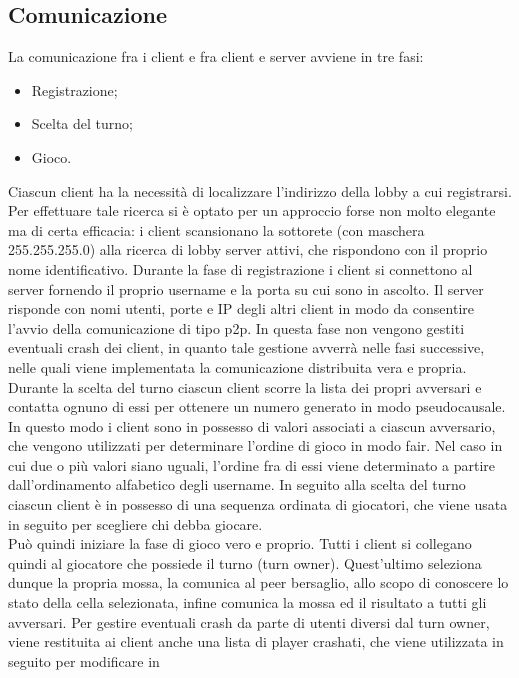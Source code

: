 \subsection{Comunicazione}
La comunicazione fra i client e fra client e server avviene in tre fasi:
\begin{itemize}
 \item Registrazione;
 \item Scelta del turno;
\item Gioco.
\end{itemize}
Ciascun client ha la necessità di localizzare l'indirizzo della lobby a cui 
registrarsi. Per effettuare tale ricerca si è optato per un approccio forse non 
molto elegante ma di certa efficacia: i client scansionano la sottorete (con 
maschera 255.255.255.0) alla ricerca di lobby server attivi, che rispondono con 
il proprio nome identificativo.
Durante la fase di registrazione i client si connettono al 
server fornendo il proprio username e la porta su cui sono in ascolto. Il 
server risponde con nomi utenti, porte e IP degli altri client in modo da 
consentire l'avvio della comunicazione di tipo p2p. In questa fase non vengono 
gestiti eventuali crash dei client, in quanto tale gestione avverrà nelle fasi 
successive, nelle quali viene implementata la comunicazione distribuita vera e 
propria.
\\
Durante la scelta del turno ciascun client scorre la lista dei propri 
avversari e contatta ognuno di essi per ottenere un numero generato in modo 
pseudocausale. In questo modo i client sono in possesso di valori associati a 
ciascun avversario, che vengono utilizzati per determinare l'ordine di gioco in 
modo fair. Nel caso in cui due o più valori siano uguali, l'ordine fra di essi 
viene determinato a partire dall'ordinamento alfabetico degli username. In 
seguito alla scelta del turno ciascun client è in possesso di una sequenza 
ordinata di giocatori, che viene usata in seguito per scegliere chi debba 
giocare.
\\
Può quindi iniziare la fase di gioco vero e proprio. Tutti i client si 
collegano quindi al giocatore che possiede il turno (turn owner). %
Quest'ultimo seleziona dunque la propria mossa, la comunica al peer bersaglio, 
allo scopo di conoscere lo stato della cella selezionata, infine comunica la 
mossa ed il risultato a tutti gli avversari. Per gestire eventuali crash 
da parte di utenti diversi dal turn owner, viene restituita ai client anche una 
lista di player crashati, che viene utilizzata in seguito per modificare in 
